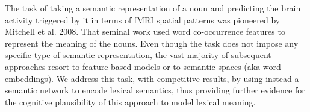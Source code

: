The task of taking a semantic representation of a noun and predicting the brain activity triggered by it in terms of fMRI spatial patterns was pioneered by Mitchell et al. 2008. That seminal work used word co-occurrence features to represent the meaning of the nouns. Even though the task does not impose any specific type of semantic representation, the vast majority of subsequent approaches resort to feature-based models or to semantic spaces (aka word embeddings). We address this task, with competitive results, by using instead a semantic network to encode lexical semantics, thus providing further evidence for the cognitive plausibility of this approach to model lexical meaning.
